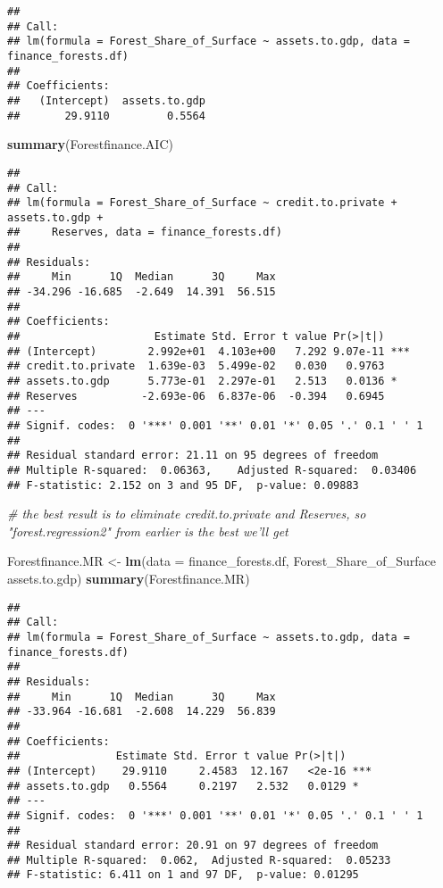 \documentclass[
  12pt,
]{article}
\newenvironment{Shaded}{\begin{snugshade}}{\end{snugshade}}
\newcommand{\CommentTok}[1]{\textcolor[rgb]{0.56,0.35,0.01}{\textit{#1}}}
\newcommand{\DataTypeTok}[1]{\textcolor[rgb]{0.13,0.29,0.53}{#1}}
\newcommand{\KeywordTok}[1]{\textcolor[rgb]{0.13,0.29,0.53}{\textbf{#1}}}
\newcommand{\NormalTok}[1]{#1}
\newcommand{\OperatorTok}[1]{\textcolor[rgb]{0.81,0.36,0.00}{\textbf{#1}}}
\newcommand{\StringTok}[1]{\textcolor[rgb]{0.31,0.60,0.02}{#1}}
\begin{document}
\begin{verbatim}
## 
## Call:
## lm(formula = Forest_Share_of_Surface ~ assets.to.gdp, data = finance_forests.df)
## 
## Coefficients:
##   (Intercept)  assets.to.gdp  
##       29.9110         0.5564
\end{verbatim}

\begin{Shaded}
\begin{Highlighting}[]
 \KeywordTok{summary}\NormalTok{(Forestfinance.AIC)}
\end{Highlighting}
\end{Shaded}

\begin{verbatim}
## 
## Call:
## lm(formula = Forest_Share_of_Surface ~ credit.to.private + assets.to.gdp + 
##     Reserves, data = finance_forests.df)
## 
## Residuals:
##     Min      1Q  Median      3Q     Max 
## -34.296 -16.685  -2.649  14.391  56.515 
## 
## Coefficients:
##                     Estimate Std. Error t value Pr(>|t|)    
## (Intercept)        2.992e+01  4.103e+00   7.292 9.07e-11 ***
## credit.to.private  1.639e-03  5.499e-02   0.030   0.9763    
## assets.to.gdp      5.773e-01  2.297e-01   2.513   0.0136 *  
## Reserves          -2.693e-06  6.837e-06  -0.394   0.6945    
## ---
## Signif. codes:  0 '***' 0.001 '**' 0.01 '*' 0.05 '.' 0.1 ' ' 1
## 
## Residual standard error: 21.11 on 95 degrees of freedom
## Multiple R-squared:  0.06363,    Adjusted R-squared:  0.03406 
## F-statistic: 2.152 on 3 and 95 DF,  p-value: 0.09883
\end{verbatim}

\begin{Shaded}
\begin{Highlighting}[]
\CommentTok{# the best result is to eliminate credit.to.private and Reserves, so "forest.regression2" from earlier is the best we'll get}

\NormalTok{Forestfinance.MR <-}\StringTok{ }\KeywordTok{lm}\NormalTok{(}\DataTypeTok{data =}\NormalTok{ finance_forests.df, Forest_Share_of_Surface }\OperatorTok{~}\StringTok{ }\NormalTok{assets.to.gdp)}
\KeywordTok{summary}\NormalTok{(Forestfinance.MR)}
\end{Highlighting}
\end{Shaded}

\begin{verbatim}
## 
## Call:
## lm(formula = Forest_Share_of_Surface ~ assets.to.gdp, data = finance_forests.df)
## 
## Residuals:
##     Min      1Q  Median      3Q     Max 
## -33.964 -16.681  -2.608  14.229  56.839 
## 
## Coefficients:
##               Estimate Std. Error t value Pr(>|t|)    
## (Intercept)    29.9110     2.4583  12.167   <2e-16 ***
## assets.to.gdp   0.5564     0.2197   2.532   0.0129 *  
## ---
## Signif. codes:  0 '***' 0.001 '**' 0.01 '*' 0.05 '.' 0.1 ' ' 1
## 
## Residual standard error: 20.91 on 97 degrees of freedom
## Multiple R-squared:  0.062,  Adjusted R-squared:  0.05233 
## F-statistic: 6.411 on 1 and 97 DF,  p-value: 0.01295
\end{verbatim}
\end{document}

